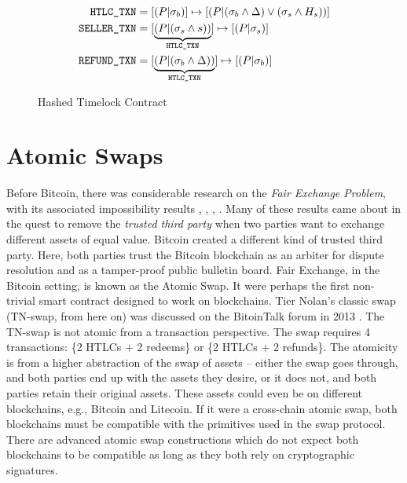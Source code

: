 \begin{figure}[!htb!]
    \centering
    \caption{Hashed Timelock Contract}
    \label{fig:htlc_txn}
\begin{align*}
    \texttt{HTLC\_TXN}{} &= [(P|\sigma_b)] \mapsto [(P|(\sigma_b \land \Delta) \lor (\sigma_s \land H_{s}))] \\
    \texttt{SELLER\_TXN}{} &= [\underbrace{(P|(\sigma_s \land s))}_{\texttt{HTLC\_TXN}{}}] \mapsto [(P|\sigma_s)] \\
    \texttt{REFUND\_TXN}{} &= [\underbrace{(P|(\sigma_b\land \Delta))}_{\texttt{HTLC\_TXN}{}}] \mapsto [(P|\sigma_b)]
\end{align*}
\end{figure}


\section{Atomic Swaps}
\label{chap:background:atomic_swaps}
Before Bitcoin, there was considerable research on the \textit{Fair Exchange Problem}, with its associated impossibility results \cite{cleve1986limits}, \cite{fair_exchange_impossibility}, \cite{franklin1997fair}, \cite{asokan1998optimistic}. Many of these results came about in the quest to remove the \textit{trusted third party} when two parties want to exchange different assets of equal value. Bitcoin created a different kind of trusted third party. Here, both parties trust the Bitcoin blockchain as an arbiter for dispute resolution and as a tamper-proof public bulletin board. Fair Exchange, in the Bitcoin setting, is known as the Atomic Swap. It were perhaps the first non-trivial smart contract designed to work on blockchains. Tier Nolan's classic swap (TN-swap, from here on) was discussed on the BitoinTalk forum in 2013 \cite{atomic_swap}. The TN-swap is not atomic from a transaction perspective. The swap requires 4 transactions: \{2 HTLCs + 2 redeems\} or \{2 HTLCs + 2 refunds\}. The atomicity is from a higher abstraction of the swap of assets -- either the swap goes through, and both parties end up with the assets they desire, or it does not, and both parties retain their original assets. These assets could even be on different blockchains, e.g., Bitcoin and Litecoin. If it were a cross-chain atomic swap, both blockchains must be compatible with the primitives used in the swap protocol. There are advanced atomic swap constructions \cite{stealth_atomic_swaps} which do not expect both blockchains to be compatible as long as they both rely on cryptographic signatures.

